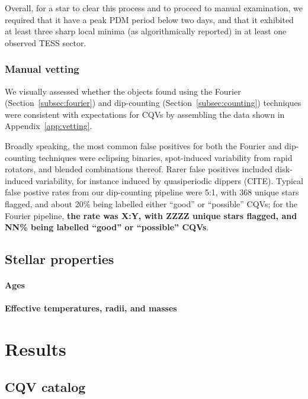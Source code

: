 \documentclass[11pt,twocolumn,tighten]{aastex63}
\begin{document}
Overall, for a star to clear this process and to proceed to manual
examination, we required that it have a peak PDM period below two
days, and that it exhibited at least three sharp local minima (as
algorithmically reported) in at least one observed TESS sector.


\subsubsection{Manual vetting}

We visually assessed whether the objects found using the Fourier
(Section~\ref{subsec:fourier}) and dip-counting
(Section~\ref{subsec:counting}) techniques were consistent with
expectations for CQVs by assembling the data shown in
Appendix~\ref{app:vetting}.

Broadly speaking, the most common false positives for both the Fourier
and dip-counting techniques were eclipsing binaries, spot-induced
variability from rapid rotators, and blended combinations thereof.
Rarer false positives included disk-induced variability, for instance
induced by quasiperiodic dippers (CITE).  Typical false postive rates
from our dip-counting pipeline were 5:1, with 368 unique stars
flagged, and about 20\% being labelled either ``good'' or ``possible''
CQVs; for the Fourier pipeline, {\bf the rate was X:Y, with ZZZZ
unique stars flagged, and NN\% being labelled ``good'' or ``possible''
CQVs}.


\subsection{Stellar properties}

\paragraph{Ages}

\paragraph{Effective temperatures, radii, and masses}



\section{Results}
\label{sec:results}

\subsection{CQV catalog}
\end{document}
